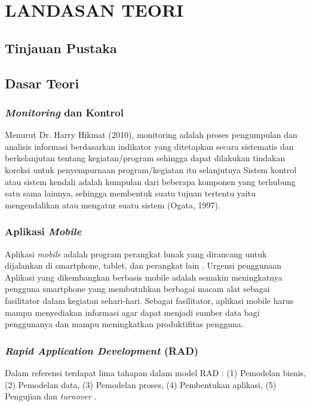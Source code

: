 \chapter{LANDASAN TEORI}

%
\vspace{4.5pt}

\begin{flushleft}
    \section{Tinjauan Pustaka}
    \section{Dasar Teori}
    \begin{justify}
        \subsection{\textit{Monitoring} dan Kontrol}
        Menurut Dr. Harry Hikmat (2010), monitoring adalah proses pengumpulan
dan analisis informasi berdasarkan indikator yang ditetapkan secara sistematis dan
berkelanjutan tentang kegiatan/program sehingga dapat dilakukan tindakan
koreksi untuk penyempurnaan program/kegiatan itu selanjutnya
Sistem kontrol atau
sistem kendali adalah kumpulan dari beberapa komponen yang terhubung satu
sama lainnya, sehingga membentuk suatu tujuan tertentu yaitu mengendalikan
atau mengatur suatu sistem (Ogata, 1997). 
\\

        \subsection{Aplikasi \textit{Mobile}}
        Aplikasi \textit{mobile} adalah program perangkat lunak yang dirancang untuk dijalankan di smartphone, tablet, dan perangkat lain \cite{mobile}. Urgensi penggunaan Aplikasi yang dikembangkan berbasis mobile adalah semakin meningkatnya pengguna smartphone yang membutuhkan berbagai macam alat sebagai fasilitator dalam kegiatan sehari-hari. Sebagai fasilitator, aplikasi mobile harus mampu menyediakan informasi agar dapat menjadi sumber data bagi penggunanya dan mampu meningkatkan produktifitas pengguna. 
        \\
        \subsection{\textit{Rapid Application Development} (RAD)}
        Dalam referensi \cite{Sukamto} terdapat lima tahapan dalam model RAD : (1) Pemodelan bisnis, (2) Pemodelan data, (3) Pemodelan proses, (4) Pembentukan aplikasi, (5) Pengujian dan \textit{turnover} .
        

\end{justify}
\end{flushleft}

